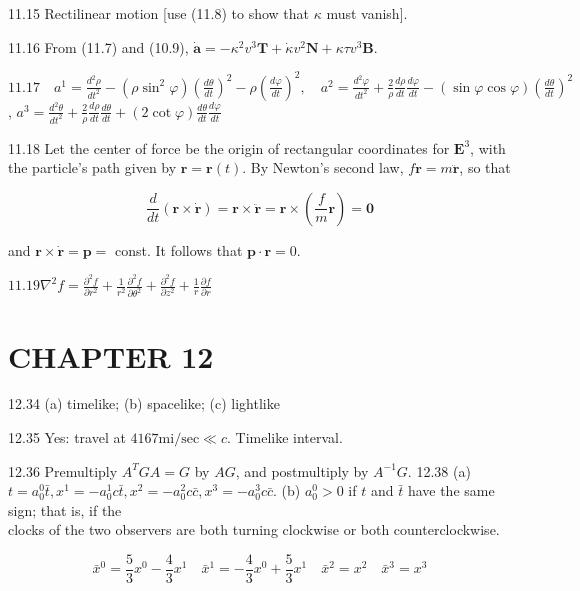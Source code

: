 \documentclass[10pt]{article}
\begin{document}
11.15 Rectilinear motion [use (11.8) to show that $\kappa$ must vanish].

11.16 From (11.7) and (10.9), $\dot{\mathbf{a}}=-\kappa^{2} v^{3} \mathbf{T}+\dot{\kappa} v^{2} \mathbf{N}+\kappa \tau v^{3} \mathbf{B}$.

$11.17 \quad a^{1}=\frac{d^{2} \rho}{d t^{2}}-\left(\rho \sin ^{2} \varphi\right)\left(\frac{d \theta}{d t}\right)^{2}-\rho\left(\frac{d \varphi}{d t}\right)^{2}, \quad a^{2}=\frac{d^{2} \varphi}{d t^{2}}+\frac{2}{\rho} \frac{d \rho}{d t} \frac{d \varphi}{d t}-(\sin \varphi \cos \varphi)\left(\frac{d \theta}{d t}\right)^{2}$, $a^{3}=\frac{d^{2} \theta}{d t^{2}}+\frac{2}{\rho} \frac{d \rho}{d t} \frac{d \theta}{d t}+(2 \cot \varphi) \frac{d \theta}{d t} \frac{d \varphi}{d t}$

11.18 Let the center of force be the origin of rectangular coordinates for $\mathbf{E}^{3}$, with the particle's path given by $\mathbf{r}=\mathbf{r}(t)$. By Newton's second law, $f \mathbf{r}=m \ddot{\mathbf{r}}$, so that

$$
\frac{d}{d t}(\mathbf{r} \times \dot{\mathbf{r}})=\mathbf{r} \times \ddot{\mathbf{r}}=\mathbf{r} \times\left(\frac{f}{m} \mathbf{r}\right)=\mathbf{0}
$$

and $\mathbf{r} \times \dot{\mathbf{r}}=\mathbf{p}=$ const. It follows that $\mathbf{p} \cdot \mathbf{r}=0$.

$11.19 \nabla^{2} f=\frac{\partial^{2} f}{\partial r^{2}}+\frac{1}{r^{2}} \frac{\partial^{2} f}{\partial \theta^{2}}+\frac{\partial^{2} f}{\partial z^{2}}+\frac{1}{r} \frac{\partial f}{\partial r}$

\section*{CHAPTER 12}
12.34 (a) timelike; (b) spacelike; (c) lightlike

12.35 Yes: travel at $4167 \mathrm{mi} / \mathrm{sec} \ll c$. Timelike interval.

12.36 Premultiply $A^{T} G A=G$ by $A G$, and postmultiply by $A^{-1} G$. 12.38 (a) $t=a_{0}^{0} \bar{t}, x^{1}=-a_{0}^{1} c \bar{t}, x^{2}=-a_{0}^{2} c \bar{c}, x^{3}=-a_{0}^{3} c \bar{c}$. (b) $a_{0}^{0}>0$ if $t$ and $\bar{t}$ have the same sign; that is, if the\\
clocks of the two observers are both turning clockwise or both counterclockwise.

$$
\bar{x}^{0}=\frac{5}{3} x^{0}-\frac{4}{3} x^{1} \quad \bar{x}^{1}=-\frac{4}{3} x^{0}+\frac{5}{3} x^{1} \quad \bar{x}^{2}=x^{2} \quad \bar{x}^{3}=x^{3}
$$
\end{document}
